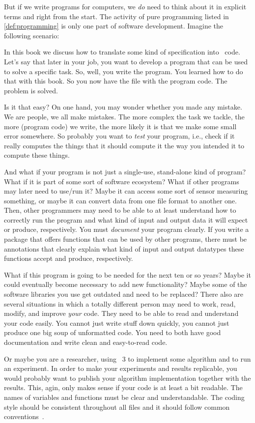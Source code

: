 But if we write programs for computers, we \emph{do} need to think about it in explicit terms and right from the start.
The activity of pure programming listed in \cref{def:programming} is only one part of software development.
Imagine the following scenario:

In this book we discuss how to translate some kind of specification into \python\ code.
Let's say that later in your job, you want to develop a program that can be used to solve a specific task.
So, well, you write the program.
You learned how to do that with this book.
So you now have the file with the program code.
The problem is solved.

Is it that easy?
On one hand, you may wonder whether you made any mistake.
We are people, we all make mistakes.
The more complex the task we tackle, the more (program code) we write, the more likely it is that we make some small error somewhere.
So probably you want to \emph{test} your program, i.e., check if it really computes the things that it should compute it the way you intended it to compute these things.

And what if your program is not just a single-use, stand-alone kind of program?
What if it is part of some sort of software ecosystem?
What if other programs may later need to use/run it?
Maybe it can access some sort of sensor measuring something, or maybe it can convert data from one file format to another one.
Then, other programmers may need to be able to at least understand how to correctly run the program and what kind of input and output data it will expect or produce, respectively.
You must \emph{document} your program clearly.
If you write a package that offers functions that can be used by other programs, there must be annotations that clearly explain what kind of input and output datatypes these functions accept and produce, respectively.

What if this program is going to be needed for the next ten or so years?
Maybe it could eventually become necessary to add new functionality?
Maybe some of the software libraries you use get outdated and need to be replaced?
There also are several situations in which a totally different person may need to work, read, modify, and improve \emph{your} code.
They need to be able to read and understand your code easily.
You cannot just write stuff down quickly, you cannot just produce one big soup of unformatted code.
You need to both have good documentation and write clean and easy-to-read code.

Or maybe you are a researcher, using \python~3 to implement some algorithm and to run an experiment.
In order to make your experiments and results replicable, you would probably want to publish your algorithm implementation together with the results.
This, agin, only makes sense if your code is at least a bit readable.
The names of variables and functions must be clear and understandable.
The coding style should be consistent throughout all files and it should follow common conventions~\cite{PEP8}.

